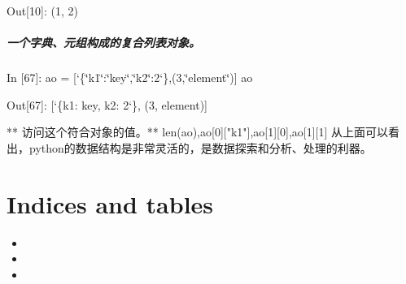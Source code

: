 \documentclass[letterpaper,10pt,english]{sphinxmanual}
\def\PYGZob{\char`\{}
\def\PYGZcb{\char`\}}
\def\PYGZsq{\char`\'}
\def\PYGZdq{\char`\"}
\renewcommand\PYGZsq{\textquotesingle}
\begin{document}
\begin{OriginalVerbatim}[commandchars=\\\{\}]
\textcolor{nbsphinxout}{Out[10]: }(1, 2)
\end{OriginalVerbatim}


\paragraph{一个字典、元组构成的复合列表对象。}
\label{pystart/pystart_databasic:_u4e00_u4e2a_u5b57_u5178_u3001_u5143_u7ec4_u6784_u6210_u7684_u590d_u5408_u5217_u8868_u5bf9_u8c61_u3002}
\begin{OriginalVerbatim}[commandchars=\\\{\}]
\textcolor{nbsphinxin}{In [67]: }ao = [\PYGZob{}\PYGZdq{}k1\PYGZdq{}:\PYGZdq{}key\PYGZdq{},\PYGZdq{}k2\PYGZdq{}:2\PYGZcb{},(3,\PYGZdq{}element\PYGZdq{})]
         ao
\end{OriginalVerbatim}

\begin{OriginalVerbatim}[commandchars=\\\{\}]
\textcolor{nbsphinxout}{Out[67]: }[\PYGZob{}\PYGZsq{}k1\PYGZsq{}: \PYGZsq{}key\PYGZsq{}, \PYGZsq{}k2\PYGZsq{}: 2\PYGZcb{}, (3, \PYGZsq{}element\PYGZsq{})]
\end{OriginalVerbatim}

** 访问这个符合对象的值。**
len(ao),ao[0]["k1"],ao[1][0],ao[1][1]
从上面可以看出，python的数据结构是非常灵活的，是数据探索和分析、处理的利器。


\chapter{Indices and tables}
\label{index:indices-and-tables}\begin{itemize}
\item {} 

\item {} 

\item {} 

\end{itemize}



\renewcommand{\indexname}{索引}
\printindex
\end{document}
